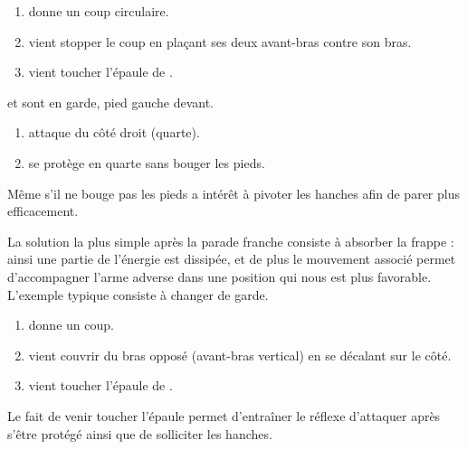 \begin{exercice}
	
	
	\begin{enumerate}
		\item \A donne un coup circulaire.
		
		\item \D vient stopper le coup en plaçant ses deux avant-bras contre son bras.
		
		\item \D vient toucher l'épaule de \A.
	\end{enumerate}
\end{exercice}


\begin{exercice}
	

	\A et \D sont en garde, pied gauche devant.

	\begin{enumerate}
		\item \A attaque \D du côté droit (quarte).
		
		\item \D se protège en quarte sans bouger les pieds.
	\end{enumerate}

	Même s'il ne bouge pas les pieds \D a intérêt à pivoter les hanches afin de parer plus efficacement.
\end{exercice}


La solution la plus simple après la parade franche consiste à absorber la frappe : ainsi une partie de l'énergie est dissipée, et de plus le mouvement associé permet d'accompagner l'arme adverse dans une position qui nous est plus favorable.
L'exemple typique consiste à changer de garde.


\begin{exercice}
	
	

	\begin{enumerate}
		\item \A donne un coup.
		
		\item \D vient couvrir du bras opposé (avant-bras vertical) en se décalant sur le côté.
		
		\item \D vient toucher l'épaule de \A.
	\end{enumerate}

	Le fait de venir toucher l'épaule permet d'entraîner le réflexe d'attaquer après s'être protégé ainsi que de solliciter les hanches.
\end{exercice}


